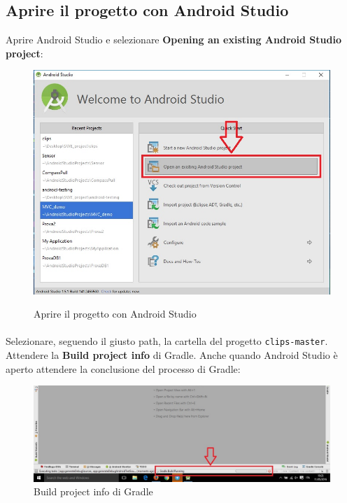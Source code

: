 \documentclass[../ManualeSviluppatore.tex]{subfiles}
\begin{document}
			
		
	\newpage	
	\subsection{Aprire il progetto con Android Studio}
		Aprire Android Studio e selezionare \textbf{Opening an existing Android Studio project}:
		
		\begin{figure} [h]
			\centering
			\includegraphics[scale=0.5]{img/AprireProgetto}
			\label{fig:AprireProgetto}
			\caption{Aprire il progetto con Android Studio}
		\end{figure}
		
		\paragraph*{}
			Selezionare, seguendo il giusto path, la cartella del progetto \verb|clips-master|. Attendere la \textbf{Build project info} di Gradle. Anche quando Android Studio è aperto attendere la conclusione del processo di Gradle:
			
		\begin{figure} [h]
			\centering
			\includegraphics[width=\textwidth]{img/BuildGradleCut}
			\caption{Build project info di Gradle}
			\label{fig:BuildGradleCut}
		\end{figure}
		
\end{document}
